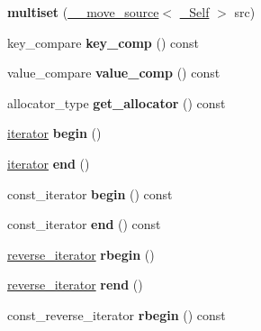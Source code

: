 \begin{DoxyCompactItemize}
{\bfseries multiset} (\hyperlink{class____move__source}{\+\_\+\+\_\+move\+\_\+source}$<$ \hyperlink{classmultiset}{\+\_\+\+Self} $>$ src)
\item 
\mbox{\label{classmultiset_aba76c9cdb23cfcc191075bc6bc41242f}} 
key\+\_\+compare {\bfseries key\+\_\+comp} () const
\item 
\mbox{\label{classmultiset_af9f18c94881f97aabda6bb2e0e5b048a}} 
value\+\_\+compare {\bfseries value\+\_\+comp} () const
\item 
\mbox{\label{classmultiset_abf7da913100c6011865053a8500bf83e}} 
allocator\+\_\+type {\bfseries get\+\_\+allocator} () const
\item 
\mbox{\label{classmultiset_ab2624498502b6cfcd62522e6ebe71f66}} 
\hyperlink{structiterator}{iterator} {\bfseries begin} ()
\item 
\mbox{\label{classmultiset_a79647d6ffd840a14b58ebc24687a8535}} 
\hyperlink{structiterator}{iterator} {\bfseries end} ()
\item 
\mbox{\label{classmultiset_a68055d92eaf8f285df22794c0ca8ce25}} 
const\+\_\+iterator {\bfseries begin} () const
\item 
\mbox{\label{classmultiset_a266c097f0a3a38ec4c1f3165f9f94614}} 
const\+\_\+iterator {\bfseries end} () const
\item 
\mbox{\label{classmultiset_a2999ddd28b3ae3b18fa4fcfe2e850c8a}} 
\hyperlink{classreverse__iterator}{reverse\+\_\+iterator} {\bfseries rbegin} ()
\item 
\mbox{\label{classmultiset_ab617ab228beb94ddadc794275bbcb2e3}} 
\hyperlink{classreverse__iterator}{reverse\+\_\+iterator} {\bfseries rend} ()
\item 
\mbox{\label{classmultiset_adda1651e5cfe3138bb634a6a5823a4b2}} 
const\+\_\+reverse\+\_\+iterator {\bfseries rbegin} () const
\item 
\mbox{\label{classmultiset_a118097dbe4f87ef663a33a80bd16402c}} 

\end{DoxyCompactItemize}
